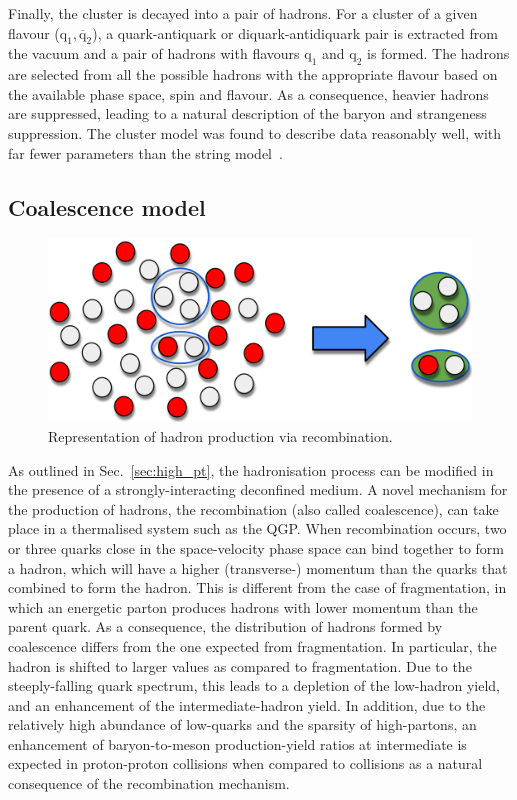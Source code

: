 Finally, the cluster is decayed into a pair of hadrons. For a cluster of a given flavour ($\mathrm{q_1, \overline{q}_2}$), a quark-antiquark or diquark-antidiquark pair is extracted from the vacuum and a pair of hadrons with flavours $\mathrm{q_1}$ and $\mathrm{q_2}$ is formed. The hadrons are selected from all the possible hadrons with the appropriate flavour based on the available phase space, spin and flavour. As a consequence, heavier hadrons are suppressed, leading to a natural description of the baryon and strangeness suppression. The cluster model was found to describe data reasonably well, with far fewer parameters than the string model~\cite{Seymour:2013ega}.

\subsection{Coalescence model}
\begin{figure}[htb]
    \centering
    \includegraphics[width=0.7\linewidth]{Figures/Chapter 2/Coalescence.png}
    \caption{Representation of hadron production via recombination.}
\end{figure}

As outlined in Sec.~\ref{sec:high_pt}, the hadronisation process can be modified in the presence of a strongly-interacting deconfined medium. A novel mechanism for the production of hadrons, the recombination (also called coalescence), can take place in a thermalised system such as the QGP. When recombination occurs, two or three quarks close in the space-velocity phase space can bind together to form a hadron, which will have a higher (transverse-) momentum than the quarks that combined to form the hadron. This is different from the case of fragmentation, in which an energetic parton produces hadrons with lower momentum than the parent quark. As a consequence, the \pt distribution of hadrons formed by coalescence differs from the one expected from fragmentation. In particular, the hadron \pt is shifted to larger values as compared to fragmentation. Due to the steeply-falling quark \pt spectrum, this leads to a depletion of the low-\pt hadron yield, and an enhancement of the intermediate-\pt hadron yield. In addition, due to the relatively high abundance of low-\pt quarks and the sparsity of high-\pt partons, an enhancement of baryon-to-meson production-yield ratios at intermediate \pt is expected in proton-proton collisions when compared to \ee collisions as a natural consequence of the recombination mechanism. 

